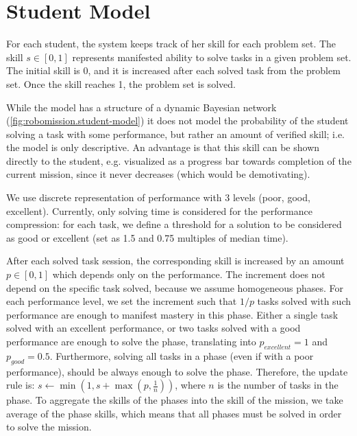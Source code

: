 \section{Student Model}
\label{sec:robomission.student}

For each student, the system keeps track of her skill for each problem set. %
The skill $s \in [0, 1]$ represents manifested ability to solve tasks in
a given problem set. The initial skill is 0, and it is increased after each solved
task from the problem set. Once the skill reaches 1, the problem set is solved.

While the model has a structure of a dynamic Bayesian network
(\cref{fig:robomission.student-model}) %
it does not model the probability of the student solving a task with some performance,
but rather an amount of verified skill;
i.e. the model is only descriptive.
An advantage is that this skill can be shown directly to the student,
e.g. visualized as a progress bar towards completion of the current mission,
since it never decreases (which would be demotivating).

We use discrete representation of performance with 3 levels (poor, good,
excellent). Currently, only solving time is considered for the performance
compression: for each task, we define a threshold for a solution to be
considered as good or excellent
(set as 1.5 and 0.75 multiples of median time).

After each solved task session, the corresponding skill is increased by
an amount $p \in [0, 1]$ which depends only on the performance.
The increment does not depend on the specific task solved, because we assume homogeneous phases.
For each performance level, we set the increment such that $1/p$ tasks solved
with such performance are enough to manifest mastery in this phase.
Either a single task solved with an excellent performance, or two
tasks solved with a good performance are enough to solve the phase,
translating into $p_{excellent} = 1$ and $p_{good} = 0.5$.
Furthermore, solving all tasks in a phase (even if with a poor performance),
should be always enough to solve the phase.
Therefore, the update rule is:
$s \leftarrow \min(1, s + \max(p, \frac{1}{n}))$,
where $n$ is the number of tasks in the phase.
To aggregate the skills of the phases into the skill of the mission,
we take average of the phase skills, which means
that all phases must be solved in order to solve the mission.

